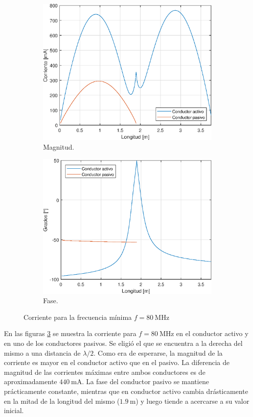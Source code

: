 \begin{figure}[H]
\begin{subfigure}{0.5\textwidth}
		\includegraphics[scale=0.6]{imagenes/i_mag_80.eps}
		\caption{Magnitud.}
		\label{fig.i_mag_80}		
	\end{subfigure}
	\quad
	\begin{subfigure}{0.5\textwidth}
		\includegraphics[scale=0.6]{imagenes/i_fase_80.eps}
		\caption{Fase.}
		\label{fig.i_fase_80}		
	\end{subfigure}
	\caption{Corriente para la frecuencia mínima $f = \SI{80}{\mega\hertz}$}
	\label{fig.i_80}	
\end{figure}

En las figuras \ref{fig.i_80} se muestra la corriente para $f=\SI{80}{\mega\hertz}$ en el conductor activo y en uno de los conductores pasivos. Se eligió el que se encuentra a la derecha del mismo a una distancia de $\lambda/2$. Como era de esperarse, la magnitud de la corriente es mayor en el conductor activo que en el pasivo. La diferencia de magnitud de las corrientes máximas entre ambos conductores es de aproximadamente $\SI{440}{\milli\ampere}$. La fase del conductor pasivo se mantiene prácticamente constante, mientras que en conductor activo cambia drásticamente en la mitad de la longitud del mismo ($\SI{1.9}{\meter}$) y luego tiende a acercarse a su valor inicial.


